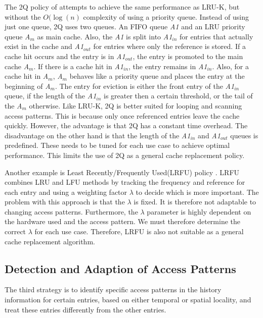\documentclass[
	12pt,
	a4paper,
	abstract,
	bibliography=totoc,
	chapterprefix,
	headings=openright,
	numbers=endperiod,
	parskip=half,
	twoside,
]{scrreprt}
\begin{document}
The 2Q policy of \cite{shasha19942q} attempts to achieve the same performance as LRU-K, 
but without the $O(\log(n)$ complexity of using a priority queue.
Instead of using just one queue, 2Q uses two queues.
An FIFO queue \emph{A1} and an LRU priority queue \emph{A$_m$} as main cache.
Also, the \emph{A1} is split into \emph{A1$_{in}$} for entries that actually exist in the cache and \emph{A1$_{out}$} 
for entries where only the reference is stored.
If a cache hit occurs and the entry is in \emph{A1$_{out}$}, the entry is promoted to the main cache \emph{A$_m$}.
If there is a cache hit in \emph{A1$_{in}$}, the entry remains in \emph{A1$_{in}$}.
Also, for a cache hit in \emph{A$_m$}, \emph{A$_m$} behaves like a priority queue and places the entry at the beginning of \emph{A$_m$}.
The entry for eviction is either the front entry of the \emph{A1$_{in}$} queue, if the length of the \emph{A1$_{in}$} 
is greater then a certain threshold, or the tail of the 
\emph{A$_m$} otherwise.
Like LRU-K, 2Q is better suited for looping and scanning access patterns.
This is because only once referenced entries leave the cache quickly.
However, the advantage is that 2Q has a constant time overhead.
The disadvantage on the other hand is that the 
length of the \emph{A1$_{in}$} and \emph{A1$_{out}$} queues is predefined.
These needs to be tuned for each use case to achieve optimal performance.
This limits the use of 2Q as a general cache replacement policy.

Another example is Least Recently/Frequently Used(LRFU) policy \cite{lee2001lrfu}.
LRFU combines LRU and LFU methods by tracking the frequency and reference for each entry and using a weighting factor $\lambda$ 
to decide which is more important.
The problem with this approach is that the $\lambda$ is fixed.
It is therefore not adaptable to changing access patterns.
Furthermore, the $\lambda$ parameter is highly dependent on the hardware used and the access pattern.
We must therefore determine the correct $\lambda$ for each use case.
Therefore, LRFU is also not suitable as a general cache replacement algorithm.

\subsection{Detection and Adaption of Access Patterns}

The third strategy is to identify specific access patterns in the history information for certain entries, 
based on either temporal or spatial locality, and treat these entries differently from the other entries.
\end{document}
